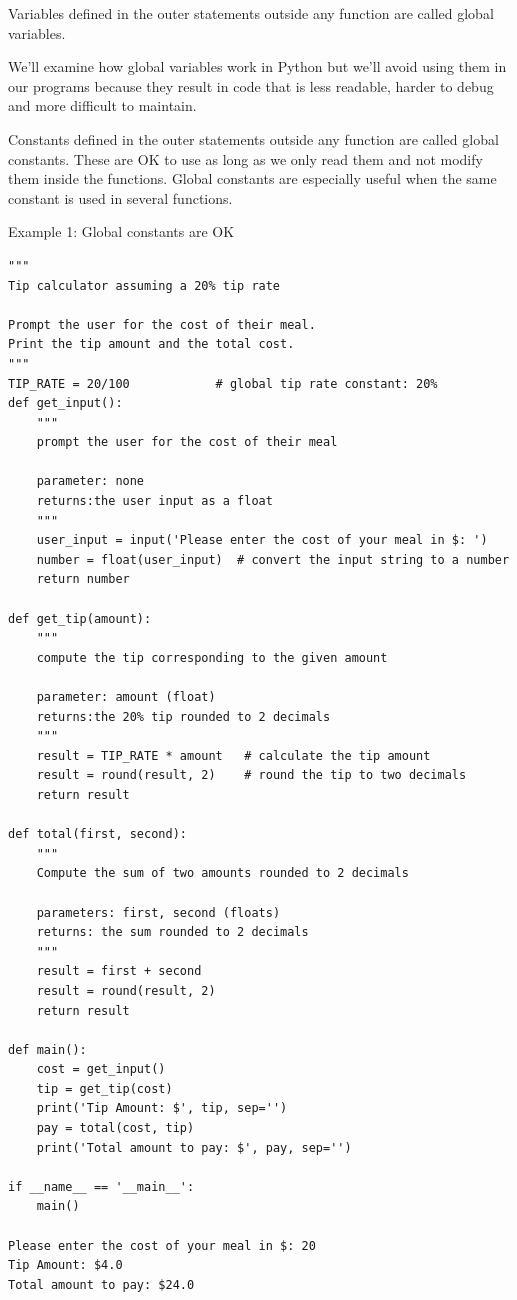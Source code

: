 \documentclass{article}
\begin{document}
Variables defined in the outer statements outside any function are called global variables.

We'll examine how global variables work in Python but we'll avoid using them in our programs because they result in code that is less readable, harder to debug and more difficult to maintain.

Constants defined in the outer statements outside any function are called global constants.  These are OK to use as long as we only read them and not modify them inside the functions.  Global constants are especially useful  when the same constant is used in several functions.

Example 1:  Global constants are OK
\begin{lstlisting}
"""
Tip calculator assuming a 20% tip rate

Prompt the user for the cost of their meal.
Print the tip amount and the total cost.
"""
TIP_RATE = 20/100            # global tip rate constant: 20%
def get_input():
    """
    prompt the user for the cost of their meal

    parameter: none
    returns:the user input as a float
    """
    user_input = input('Please enter the cost of your meal in $: ')
    number = float(user_input)  # convert the input string to a number
    return number

def get_tip(amount):
    """
    compute the tip corresponding to the given amount

    parameter: amount (float)
    returns:the 20% tip rounded to 2 decimals
    """
    result = TIP_RATE * amount   # calculate the tip amount
    result = round(result, 2)    # round the tip to two decimals
    return result

def total(first, second):
    """
    Compute the sum of two amounts rounded to 2 decimals

    parameters: first, second (floats)
    returns: the sum rounded to 2 decimals
    """
    result = first + second
    result = round(result, 2)
    return result

def main():
    cost = get_input()
    tip = get_tip(cost)
    print('Tip Amount: $', tip, sep='')
    pay = total(cost, tip)
    print('Total amount to pay: $', pay, sep='')

if __name__ == '__main__':
    main()
 
Please enter the cost of your meal in $: 20
Tip Amount: $4.0
Total amount to pay: $24.0
\end{lstlisting}
\end{document}
